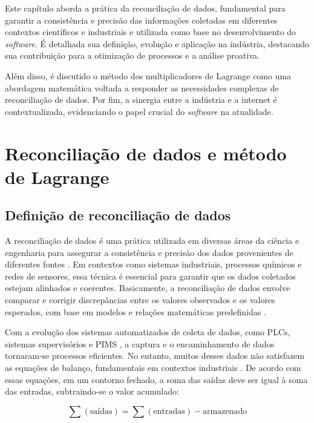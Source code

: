\label{Cap:ReferencialTeorico}

Este capítulo aborda a prática da reconciliação de dados, fundamental para garantir a consistência e precisão das informações coletadas em diferentes contextos científicos e industriais e utilizada como base no desenvolvimento do \textit{software}. É detalhada sua definição, evolução e aplicação na indústria, destacando sua contribuição para a otimização de processos e a análise proativa. 
    
Além disso, é discutido o método dos multiplicadores de Lagrange como uma abordagem matemática voltada a responder as necessidades complexas de reconciliação de dados. Por fim, a sinergia entre a indústria e a internet é contextualizada, evidenciando o papel crucial do \textit{software} na atualidade.

\section{Reconciliação de dados e método de Lagrange}


\subsection{Definição de reconciliação de dados}

A reconciliação de dados é uma prática utilizada em diversas áreas da ciência e engenharia para assegurar a consistência e precisão dos dados provenientes de diferentes fontes \cite{datarecshakar}. Em contextos como sistemas industriais, processos químicos e redes de sensores, essa técnica é essencial para garantir que os dados coletados estejam alinhados e coerentes. Basicamente, a reconciliação de dados envolve comparar e corrigir discrepâncias entre os valores observados e os valores esperados, com base em modelos e relações matemáticas predefinidas \cite{datarecragnoli}.

Com a evolução dos sistemas automatizados de coleta de dados, como PLCs, sistemas supervisórios e PIMS \cite{plcsupervisory2021}, a captura e o encaminhamento de dados tornaram-se processos eficientes. No entanto, muitos desses dados não satisfazem as equações de balanço, fundamentais em contextos industriais \cite{balance2020}. De acordo com essas equações, em um contorno fechado, a soma das saídas deve ser igual à soma das entradas, subtraindo-se o valor acumulado:

\begin{equation}
    \sum (\text{saídas}) = \sum (\text{entradas}) - \text{armazenado}
\end{equation}

